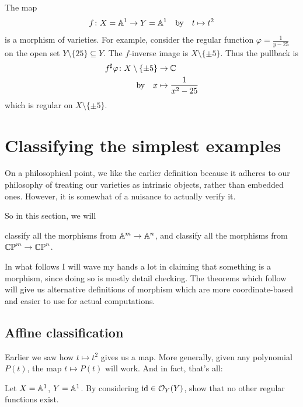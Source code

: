 \begin{example}
	The map
	\[ f \colon X = \mathbb A^1 \to Y = \mathbb A^1 \quad\text{by}\quad t \mapsto t^2 \]
	is a morphism of varieties.
	For example, consider the regular function $\varphi = \frac{1}{y-25}$ on
	the open set $Y \setminus \{25\} \subseteq Y$.
	The $f$-inverse image is $X \setminus \{\pm5\}$.
	Thus the pullback is
	\begin{align*}
		f^\sharp\varphi \colon X \setminus \{\pm5\} &\to \mathbb C \\
		\quad\text{by}\quad x &\mapsto \frac{1}{x^2-25}
	\end{align*}
	which is regular on $X \setminus \{\pm5\}$.
\end{example}

\section{Classifying the simplest examples}

On a philosophical point, we like the earlier definition because
it adheres to our philosophy of treating our
varieties as intrinsic objects, rather than embedded ones.
However, it is somewhat of a nuisance to actually verify it.

So in this section, we will
\begin{itemize}
	\ii classify all the morphisms from $\mathbb A^m \to \mathbb A^n$, and
	\ii classify all the morphisms from $\mathbb{CP}^m \to \mathbb{CP}^n$.
\end{itemize}
In what follows I will wave my hands a lot in claiming
that something is a morphism, since doing so is mostly detail checking.
The theorems which follow will give us alternative definitions
of morphism which are more coordinate-based
and easier to use for actual computations.

\subsection{Affine classification}
Earlier we saw how $t \mapsto t^2$ gives us a map.
More generally, given any polynomial $P(t)$,
the map $t \mapsto P(t)$ will work.
And in fact, that's all:
\begin{exercise}
	Let $X = \mathbb A^1$, $Y = \mathbb A^1$.
	By considering $\mathrm{id} \in \mathcal O_Y(Y)$, show that no other
	regular functions exist.
\end{exercise}

